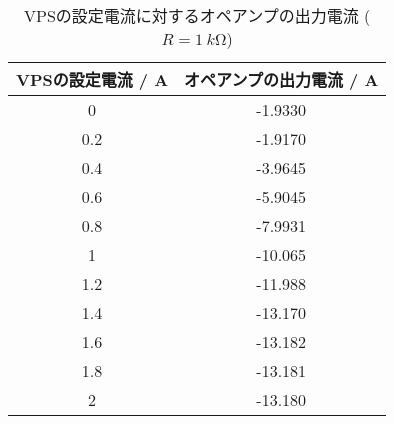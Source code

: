 \begin{table}[!htp]\centering
	\caption{VPSの設定電流に対するオペアンプの出力電流 ($R=\SI{1}{k\ohm}$)}\label{tab:exp3-1k}
	\scriptsize
	\begin{tabular}{cc}\toprule
		VPSの設定電流 / A & オペアンプの出力電流 / A \\\midrule
		0            & -1.9330        \\
		0.2          & -1.9170        \\
		0.4          & -3.9645        \\
		0.6          & -5.9045        \\
		0.8          & -7.9931        \\
		1            & -10.065        \\
		1.2          & -11.988        \\
		1.4          & -13.170        \\
		1.6          & -13.182        \\
		1.8          & -13.181        \\
		2            & -13.180        \\
		\bottomrule
	\end{tabular}
\end{table}
